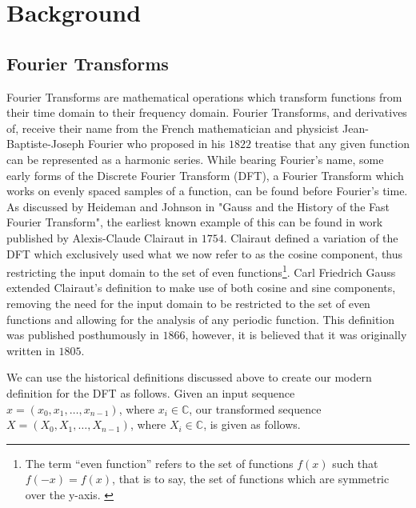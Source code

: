 \section{Background}
\subsection{Fourier Transforms}
Fourier Transforms are mathematical operations which transform functions from their time domain to their frequency domain.
Fourier Transforms, and derivatives of, receive their name from the French mathematician and physicist Jean-Baptiste-Joseph Fourier who proposed in his $1822$\cite{Fourier1822} treatise that any given function can be represented as a harmonic series.\cite{Saribulut2013} 
While bearing Fourier's name, some early forms of the Discrete Fourier Transform (DFT), a Fourier Transform which works on evenly spaced samples of a function, can be found before Fourier's time.
As discussed by Heideman and Johnson in "Gauss and the History of the Fast Fourier Transform"\cite{Heideman1985}, the earliest known example of this can be found in work published by Alexis-Claude Clairaut in $1754$\cite{Clairaut1754}.
Clairaut defined a variation of the DFT which exclusively used what we now refer to as the cosine component, thus restricting the input domain to the set of even functions\footnote{The term ``even function'' refers to the set of functions $f(x)$ such that $f(-x)=f(x)$, that is to say, the set of functions which are symmetric over the y-axis.  \cite{Gelfand1990}\cite{Tolstov1962}}.\cite{Heideman1985}
Carl Friedrich Gauss extended Clairaut's definition to make use of both cosine and sine components, removing the need for the input domain to be restricted to the set of even functions and allowing for the analysis of any periodic function.\cite{Gauss1866}\cite{Heideman1985}
This definition was published posthumously in $1866$, however, it is believed that it was originally written in $1805$.\cite{Heideman1985} 

We can use the historical definitions discussed above to create our modern definition for the DFT as follows.
Given an input sequence $x = 
        (x_0,x_1,\dots,x_{n-1})$,
            where $x_i\in\mathbb{C}
            $,
our transformed sequence $X =
        (X_0,X_1,\dots,X_{n-1})$,
            where $X_i\in\mathbb{C}
            $,
is given as follows.

